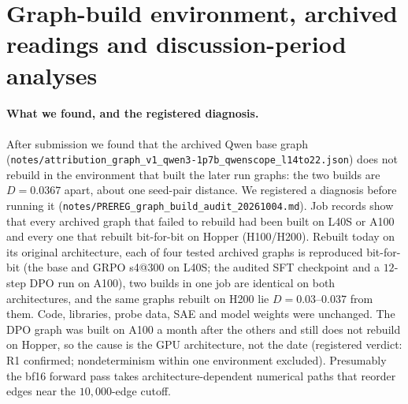 \documentclass{article}
\begin{document}
\section{Graph-build environment, archived readings and discussion-period analyses}
\label{app:build}

\paragraph{What we found, and the registered diagnosis.} After submission we found that the archived Qwen base graph (\texttt{notes/attribution\_graph\_v1\_qwen3-1p7b\_qwenscope\_l14to22.json}) does not rebuild in the environment that built the later run graphs: the two builds are $D=0.0367$ apart, about one seed-pair distance. We registered a diagnosis before running it (\texttt{notes/PREREG\_graph\_build\_audit\_20261004.md}). Job records show that every archived graph that failed to rebuild had been built on L40S or A100 and every one that rebuilt bit-for-bit on Hopper (H100/H200). Rebuilt today on its original architecture, each of four tested archived graphs is reproduced bit-for-bit (the base and GRPO s4@$300$ on L40S; the audited SFT checkpoint and a $12$-step DPO run on A100), two builds in one job are identical on both architectures, and the same graphs rebuilt on H200 lie $D=0.03$--$0.037$ from them. Code, libraries, probe data, SAE and model weights were unchanged. The DPO graph was built on A100 a month after the others and still does not rebuild on Hopper, so the cause is the GPU architecture, not the date (registered verdict: R1 confirmed; nondeterminism within one environment excluded). Presumably the bf16 forward pass takes architecture-dependent numerical paths that reorder edges near the $10{,}000$-edge cutoff.
\end{document}
